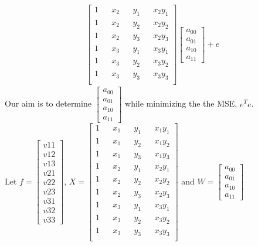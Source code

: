 \documentclass[a4paper,fleqn,11pt]{article}
\theoremstyle{mytheor}
\begin{document}
\begin{align}
\begin{bmatrix}
				1 && x_2 &&	y_1 && x_2y_1 \\
				1 && x_2 &&	y_2 && x_2y_2 \\
				1 && x_2 &&	y_3 && x_2y_3 \\
				1 && x_3 &&	y_1 && x_3y_1 \\
				1 && x_3 &&	y_2 && x_3y_2 \\
				1 && x_3 &&	y_3 && x_3y_3 \\
			\end{bmatrix}
			\begin{bmatrix}
				a_{00} \\
				a_{01} \\
				a_{10} \\
				a_{11}	
			\end{bmatrix} + e
\end{align}
Our aim is to determine $\begin{bmatrix}
							a_{00} \\
							a_{01} \\
							a_{10} \\
							a_{11}	
						  \end{bmatrix}$ while minimizing the the MSE, $e^Te$. \\
Let $f = \begin{bmatrix}
				v{11} \\
				v{12} \\
				v{13} \\
				v{21} \\
				v{22} \\
				v{23} \\
				v{31} \\
				v{32} \\
				v{33}
			\end{bmatrix}$,
    $X = \begin{bmatrix}
				1 && x_1 &&	y_1 && x_1y_1 \\
				1 && x_1 &&	y_2 && x_1y_2 \\
				1 && x_1 &&	y_3 && x_1y_3 \\
				1 && x_2 &&	y_1 && x_2y_1 \\
				1 && x_2 &&	y_2 && x_2y_2 \\
				1 && x_2 &&	y_3 && x_2y_3 \\
				1 && x_3 &&	y_1 && x_3y_1 \\
				1 && x_3 &&	y_2 && x_3y_2 \\
				1 && x_3 &&	y_3 && x_3y_3 \\
			\end{bmatrix}$ and
	$W = \begin{bmatrix}
			a_{00} \\
			a_{01} \\
			a_{10} \\
			a_{11}	
		 \end{bmatrix}$
\end{document}
